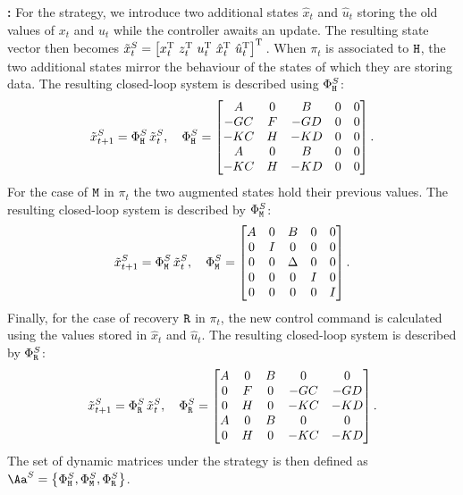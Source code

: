 \textbf{\tS{}: }%
%
For the \tS{} strategy, we introduce two additional states $\hat x_t$ and $\hat u_t$ storing the old values of $x_t$ and $u_t$ while the controller awaits an update.
The resulting state vector then becomes $\tilde x_t^{S} = \left[ x_t^{\mathrm{\small{T}}}{}\,\,z_t^{\mathrm{\small{T}}}{}\,\, u_t^{\mathrm{\small{T}}}{}\,\, \hat{x}_t^{\mathrm{\small{T}}}{}\,\, \hat{u}_t^{\mathrm{\small{T}}}{} \right]^{\mathrm{\small{T}}}{}$.
When $\pi_t$ is associated to $\texttt{H}$, the two additional states mirror the behaviour of the states of which they are storing data.
The resulting closed-loop system is described using $\Phi{}^{S}_{\texttt{H}}$:
%
\begin{equation*}
    \tilde x_{t+1}^{S} = \Phi{}^{S}_{\texttt{H}}\,\tilde x_t^{S}, \quad
    \Phi{}^{S}_{\texttt{H}} = \begin{bmatrix}
        A       & 0    & B      & 0 & 0 \\
        -GC   & F  & -GD  & 0 & 0 \\
        -KC   & H  & -KD  & 0 & 0 \\
        A       & 0    & B      & 0 & 0 \\
        -KC   & H  & -KD  & 0 & 0 \\
    \end{bmatrix}.
\end{equation*}
%
For the case of $\texttt{M}$ in $\pi_t$ the two augmented states hold their previous values.
The resulting closed-loop system is described by $\Phi{}^{S}_{\texttt{M}}$:
%
\begin{equation*}
    \tilde x_{t+1}^{S} = \Phi{}^{S}_{\texttt{M}}\,\tilde x_t^{S}, \quad
    \Phi{}^{S}_{\texttt{M}}=\begin{bmatrix}
        A & 0  & B & 0 & 0 \\
        0   & I  & 0   & 0 & 0 \\
        0   & 0  & \Delta   & 0 & 0 \\
        0   & 0  & 0   & I & 0 \\
        0   & 0  & 0   & 0 & I \\
    \end{bmatrix}.
\end{equation*}
%
Finally, for the case of recovery $\texttt{R}$ in $\pi_t$, the new control command is calculated using the values stored in $\hat x_t$ and $\hat u_t$.
The resulting closed-loop system is described by $\Phi{}^{S}_{\texttt{R}}$:
%
\begin{equation*}
    \tilde x_{t+1}^{S} = \Phi{}^{S}_{\texttt{R}} \, \tilde x_{t}^{S}, \quad
    \Phi{}^{S}_{\texttt{R}} = \begin{bmatrix}
        A & 0    & B & 0       & 0 \\
        0   & F  & 0   & -GC & -GD \\
        0   & H  & 0   & -KC & -KD \\
        A & 0    & B & 0       & 0 \\
        0   & H  & 0   & -KC & -KD \\
    \end{bmatrix}.
\end{equation*}
%
The set of dynamic matrices under the \tS{} strategy is then defined as $\Aa^{S}=\left\{\clmat{}^{S}_{\cH},\clmat{}^{S}_{\cM},\clmat{}^{S}_{\cR}\right\}$.

